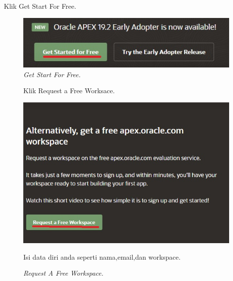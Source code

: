 \begin{enumerate}
\item[1]Klik Get Start For Free.

\begin{figure}[!htbp]
    \begin{center}
    \includegraphics[scale=0.7]{figures/start.jpg}
    \caption{\textit{Get Start For Free.}}
    \end{center}   
    \end{figure}
    
\begin{figure}[!htbp]
\item[2]Klik Request a Free Worksace.

    \begin{center}
    \includegraphics[scale=0.5]{figures/request_wspace.jpg}
    \caption{\textit{Request A Free Workspace.}}
    \end{center}

\item[3]Isi data diri anda seperti nama,email,dan workspace.


\end{figure}
\end{enumerate}
